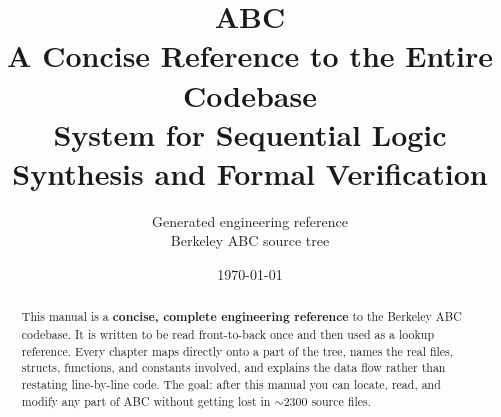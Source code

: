 \documentclass[11pt,oneside]{report}
\title{\Huge\textbf{ABC}\\[0.4em]
       \LARGE A Concise Reference to the Entire Codebase\\[0.6em]
       \large System for Sequential Logic Synthesis and Formal Verification}
\author{Generated engineering reference \\ \small Berkeley ABC source tree}
\date{\today}
\begin{document}
\maketitle

\begin{abstract}
\noindent
This manual is a \textbf{concise, complete engineering reference} to the Berkeley
ABC codebase. It is written to be read front-to-back once and then used as a
lookup reference. Every chapter maps directly onto a part of the 
tree, names the real files, structs, functions, and constants involved, and
explains the data flow rather than restating line-by-line code. The goal: after
this manual you can locate, read, and modify any part of ABC without getting
lost in \(\sim\)2300 source files.
\end{abstract}

\tableofcontents















\end{document}
